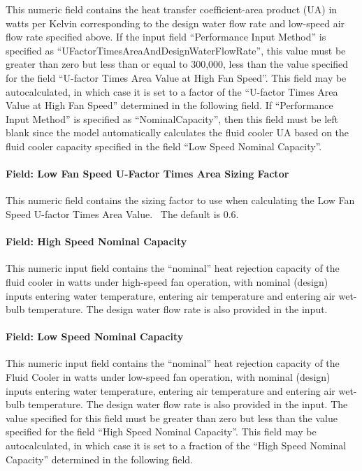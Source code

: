 This numeric field contains the heat transfer coefficient-area product (UA) in watts per Kelvin corresponding to the design water flow rate and low-speed air flow rate specified above. If the input field ``Performance Input Method'' is specified as ``UFactorTimesAreaAndDesignWaterFlowRate'', this value must be greater than zero but less than or equal to 300,000, less than the value specified for the field ``U-factor Times Area Value at High Fan Speed''. This field may be autocalculated, in which case it is set to a factor of the ``U-factor Times Area Value at High Fan Speed'' determined in the following field. If ``Performance Input Method'' is specified as ``NominalCapacity'', then this field must be left blank since the model automatically calculates the fluid cooler UA based on the fluid cooler capacity specified in the field ``Low Speed Nominal Capacity''.

\paragraph{Field: Low Fan Speed U-Factor Times Area Sizing Factor}\label{field-low-fan-speed-u-factor-times-area-sizing-factor-2}

This numeric field contains the sizing factor to use when calculating the Low Fan Speed U-factor Times Area Value.~ The default is 0.6.

\paragraph{Field: High Speed Nominal Capacity}\label{field-high-speed-nominal-capacity-1}

This numeric input field contains the ``nominal'' heat rejection capacity of the fluid cooler in watts under high-speed fan operation, with nominal (design) inputs entering water temperature, entering air temperature and entering air wet-bulb temperature. The design water flow rate is also provided in the input.

\paragraph{Field: Low Speed Nominal Capacity}\label{field-low-speed-nominal-capacity-1}

This numeric input field contains the ``nominal'' heat rejection capacity of the Fluid Cooler in watts under low-speed fan operation, with nominal (design) inputs entering water temperature, entering air temperature and entering air wet-bulb temperature. The design water flow rate is also provided in the input. The value specified for this field must be greater than zero but less than the value specified for the field ``High Speed Nominal Capacity''. This field may be autocalculated, in which case it is set to a fraction of the ``High Speed Nominal Capacity'' determined in the following field.

